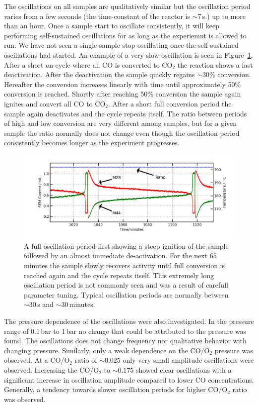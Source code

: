\documentclass[8.5pt,twoside,twocolumn]{article}
\begin{document}
The oscillations on all samples are qualitatively similar but the oscillation period varies from a few seconds (the time-constant of the reactor is $\sim7\,$s.) up to more than an hour. Once a sample start to oscillate consistently, it will keep performing self-sustained oscillations for as long as the experiemnt is allowed to run. We have not seen a single sample stop oscillating once the self-sustained oscillations had started. An example of a very slow oscillation is seen in Figure~\ref{fgr:full_oscillation}. After a short on-cycle where all CO is converted to CO$_2$ the reaction shows a fast deactivation. After the deactivation the sample quickly regains $\sim$30\% conversion. Hereafter the conversion increases linearly with time until approximately 50\% conversion is reached. Shortly after reaching 50\% conversion the sample again ignites and convert all CO to CO$_2$. After a short full conversion period the sample again deactivates and the cycle repeats itself. The ratio between periods of high and low conversion are very different among samples, but for a given sample the ratio normally does not change even though the oscillation period consistently becomes longer as the experiment progresses.
\begin{figure}
  \centering
  \includegraphics[width=17cm]{single_full_oscillation.png}
  \caption{A full oscillation period first showing a steep ignition of the sample followed by an almost immediate de-activation. For the next 65 minutes the sample slowly recovers activity until full conversion is reached again and the cycle repeats itself. This extremely long oscillation period is not commonly seen and was a result of carefull parameter tuning. Typical oscillation periods are normally between $\sim$30\,s and $\sim$30\,minutes.}
  \label{fgr:full_oscillation}
\end{figure}

The pressure dependence of the oscillations were also investigated. In the pressure range of 0.1\,bar to 1\,bar no change that could be attributed to the pressure was found. The oscillations does not change frequency nor qualitative behavior with changing pressure. Similarly, only a weak dependence on the CO/O$_2$ pressure was observed. At a CO/O$_2$ ratio of $\sim0.025$ only very small amplitude oscillations were observed. Increasing the CO/O$_2$ to $\sim0.175$ showed clear oscillations with a significant increase in oscillation amplitude compared to lower CO concentrations. Generally, a tendency towards slower oscillation periods for higher CO/O$_2$ ratio was observed.
\end{document}
